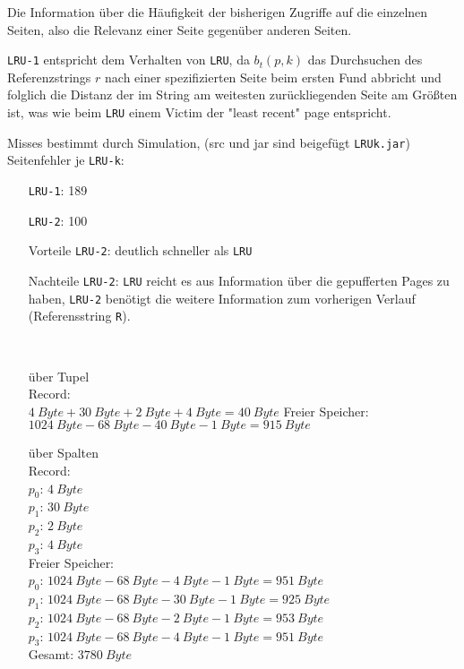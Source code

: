 \documentclass{uni_tue_template}
\newcommand{\code}[1]{\texttt{{\footnotesize #1}}}
\begin{document}
	\item Die Information über die Häufigkeit der bisherigen Zugriffe auf die einzelnen Seiten, also die Relevanz einer Seite gegenüber anderen Seiten.
\subExEnd
%
\newpage
%
\exercise{}
	\item \code{LRU-1} entspricht dem Verhalten von \code{LRU}, da $b_t(p, k)$ das Durchsuchen des Referenzstrings $r$ nach einer spezifizierten Seite beim ersten Fund abbricht und folglich die Distanz der im String am weitesten zurückliegenden Seite am Größten ist, was wie beim \code{LRU} einem Victim der "least recent" page entspricht.
	\item Misses bestimmt durch Simulation, (src und jar sind beigefügt \code{LRUk.jar})\\
	Seitenfehler je \code{LRU-k}:
	\begin{itemize}
		\item[\code{LRU-1}:] 189
		\item[\code{LRU-2}:] 100
	\end{itemize}
	\begin{itemize}
		\item[Vorteile  \code{LRU-2}:] deutlich schneller als \code{LRU}
		\item[Nachteile \code{LRU-2}:] \code{LRU} reicht es aus Information über die gepufferten Pages zu haben, \code{LRU-2} benötigt die weitere Information zum vorherigen Verlauf (Referensstring \code{R}).
	\end{itemize} 
\subExEnd
%
\newpage
%
\exercise{}
	\item \hfill\\
		\begin{enumerate}
			\item[über Tupel]\hfill\\
				Record:\\
				$\SI{4}{Byte} + \SI{30}{Byte} + \SI{2}{Byte} + \SI{4}{Byte} = \SI{40}{Byte}$
				Freier Speicher:\\
				$\SI{1024}{Byte} - \SI{68}{Byte} - \SI{40}{Byte} - \SI{1}{Byte} = \SI{915}{Byte}$
			\item[über Spalten]\hfill\\
				Record:\\
				$p_0$: $\SI{4}{Byte}$\\
				$p_1$: $\SI{30}{Byte}$\\
				$p_2$: $\SI{2}{Byte}$\\
				$p_3$: $\SI{4}{Byte}$\\
				Freier Speicher:\\
				$p_0$: $\SI{1024}{Byte} - \SI{68}{Byte} - \SI{4}{Byte} - \SI{1}{Byte} = \SI{951}{Byte}$\\
				$p_1$: $\SI{1024}{Byte} - \SI{68}{Byte} - \SI{30}{Byte} - \SI{1}{Byte} = \SI{925}{Byte}$\\
				$p_2$: $\SI{1024}{Byte} - \SI{68}{Byte} - \SI{2}{Byte} - \SI{1}{Byte} = \SI{953}{Byte}$\\
				$p_3$: $\SI{1024}{Byte} - \SI{68}{Byte} - \SI{4}{Byte} - \SI{1}{Byte} = \SI{951}{Byte}$\\
				Gesamt: $\SI{3780}{Byte}$
		\end{enumerate}
\end{document}
